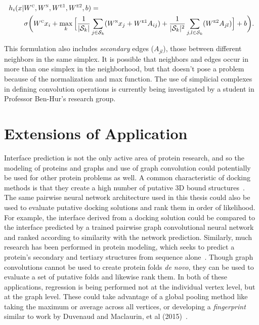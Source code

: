 \begin{equation}
\begin{split}
h_i(x |  & W^{\textsc{c}}, W^{\textsc{n}}, W^{\textsc{e1}}, W^{\textsc{e2}}, b) = \\ 
&\sigma \bigg( W^{\textsc{c}} x_i + \max_{k} \Big[ \frac{1}{|\mathcal{S}_k|}  \sum_{j \in \mathcal{S}_k} ( W^{\textsc{n}} x_j + W^{\textsc{e1}} A_{ij} ) + \frac{1}{|\mathcal{S}_k|^{2}}\sum_{j, l \in \mathcal{S}_k} (W^{\textsc{e2}} A_{jl}) \Big] + b \bigg).
\end{split}
\label{eq:simplicial_complex_conv}
\end{equation}

\noindent
This formulation also includes \emph{secondary} edges ($A_{jl}$), those between different neighbors in the same simplex.
It is possible that neighbors and edges occur in more than one simplex in the neighborhood, but that doesn't pose a problem because of the normalization and max function.
The use of simplicial complexes in defining convolution operations is currently being investigated by a student in Professor Ben-Hur's research group.


\section{Extensions of Application}

Interface prediction is not the only active area of protein research, and so the modeling of proteins and graphs and use of graph convolution could potentially be used for other protein problems as well.
A common characteristic of docking methods is that they create a high number of putative 3D bound structures~\cite{janin2013}.
The same pairwise neural network architecture used in this thesis could also be used to evaluate putative docking solutions and rank them in order of likelihood.
For example, the interface derived from a docking solution could be compared to the interface predicted by a trained pairwise graph convolutional neural network and ranked according to similarity with the network prediction.
Similarly, much research has been performed in protein modeling, which seeks to predict a protein's secondary and tertiary structures from sequence alone~\cite{schwede2013}.
Though graph convolutions cannot be used to create protein folds \emph{de novo}, they can be used to evaluate a set of putative folds and likewise rank them.
In both of these applications, regression is being performed not at the individual vertex level, but at the graph level.
These could take advantage of a global pooling method like taking the maximum or average across all vertices, or developing a \emph{fingerprint} similar to work by Duvenaud and Maclaurin, et al (2015)~\cite{duvenaud2015}.

